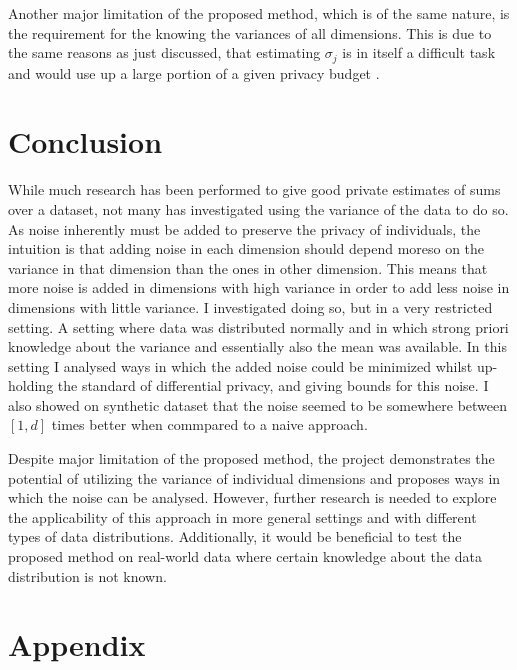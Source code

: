 \documentclass[a4paper,12pt]{article}
\begin{document}
Another major limitation of the proposed method, which is of the same nature, is the requirement for the knowing the 
variances of all dimensions. This is due to the same reasons as just discussed, that estimating $\sigma_j$ is in itself a 
difficult task and would use up a large portion of a given privacy budget \cite{Huang2021}.

\section{Conclusion}
While much research has been performed to give good private estimates of sums over a dataset, not many has
investigated using the variance of the data to do so. As noise inherently must be added to preserve the privacy of individuals,
the intuition is that adding noise in each dimension should depend moreso on the variance in that dimension than the ones in other dimension.
This means that more noise is added in dimensions with high variance in order to add less noise in dimensions with little variance.
I investigated doing so, but in a very restricted setting. A setting where data was distributed normally and 
in which strong priori knowledge about the variance and essentially also the mean was available.
In this setting I analysed ways in which the added noise could be minimized whilst up-holding 
the standard of differential privacy, and giving bounds for this noise. I also showed on synthetic dataset
that the noise seemed to be somewhere between $[1,d]$ times better when commpared to a naive approach.

Despite major limitation of the proposed method, the project demonstrates the potential of 
utilizing the variance of individual dimensions
and proposes ways in which the noise can be analysed.
However, further research is needed to explore the applicability 
of this approach in more general settings and with different types of data distributions.
Additionally, it would be beneficial to test the proposed method on real-world data where
certain knowledge about the data distribution is not known.


\newpage

{}


\newpage
\appendix
\section*{Appendix}
\end{document}
